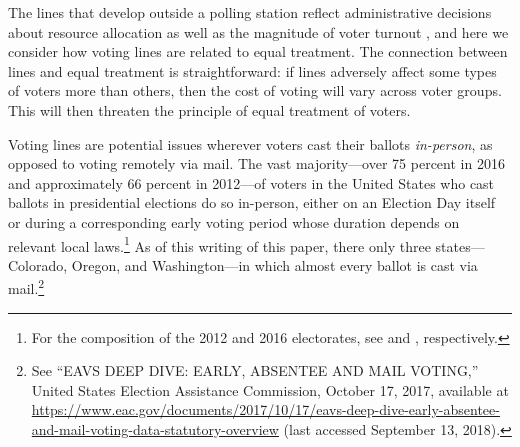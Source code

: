 \documentclass[12pt,titlepage]{article}
\begin{document}

The lines that develop outside a polling station reflect
administrative decisions about resource allocation as well as the
magnitude of voter turnout \citep{herronsmith:hanoverstudy}, and here
we consider how voting lines are related to equal treatment.  The
connection between lines and equal treatment is straightforward: if
lines adversely affect some types of voters more than others, then the
cost of voting will vary across voter groups.  This will then threaten the
principle of equal treatment of voters.


Voting lines are potential issues wherever voters cast their ballots
\emph{in-person}, as opposed to voting remotely via mail.  The vast
majority---over 75 percent in 2016 and approximately 66 percent in
2012---of voters in the United States who cast ballots in presidential
elections do so in-person, either on an Election Day itself or during
a corresponding early voting period whose duration depends on relevant
local laws.\footnote{For the composition of the 2012 and 2016
  electorates, see \citet{eac:2012} and \citet{eac:2016},
  respectively.}  As of this writing of this paper, there only three
states---Colorado, Oregon, and Washington---in which almost every
ballot is cast via mail.\footnote{See ``EAVS DEEP DIVE: EARLY,
  ABSENTEE AND MAIL VOTING,'' United States Election Assistance
  Commission, October 17, 2017, available at
  \url{https://www.eac.gov/documents/2017/10/17/eavs-deep-dive-early-absentee-and-mail-voting-data-statutory-overview}
  (last accessed September 13, 2018).}

\end{document}
